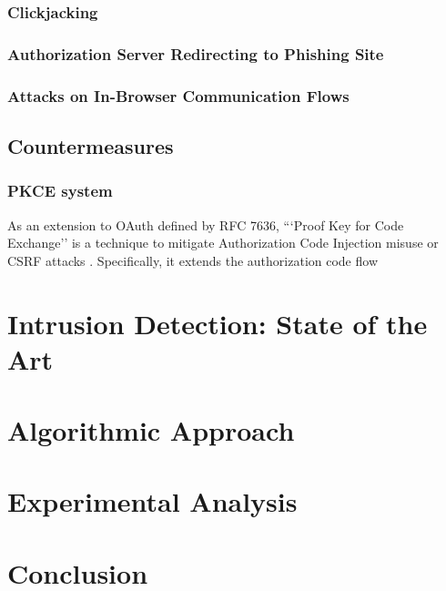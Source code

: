 \documentclass[
    fontsize=12pt,
    headings=small,
    parskip=half,           %
    bibliography=totoc,
    numbers=noenddot,       %
    open=any,               %
    ]{scrreprt}
\begin{document}
\subsection{Clickjacking}

\subsection{Authorization Server Redirecting to Phishing Site}

\subsection{Attacks on In-Browser Communication Flows}

\section{Countermeasures}
\subsection{PKCE system}
As an extension to OAuth defined by RFC 7636, ```Proof Key for Code Exchange'' is a technique to mitigate Authorization Code Injection misuse or CSRF attacks \cite{bradley2015rfc}. Specifically, it extends the authorization code flow 

\chapter{Intrusion Detection: State of the Art}

\chapter{Algorithmic Approach}

\chapter{Experimental Analysis}

\chapter{Conclusion}


\begin{raggedright}         %
  \printbibliography        %
  \label{sec:literaturverzeichnis}
\end{raggedright}
\end{document}
